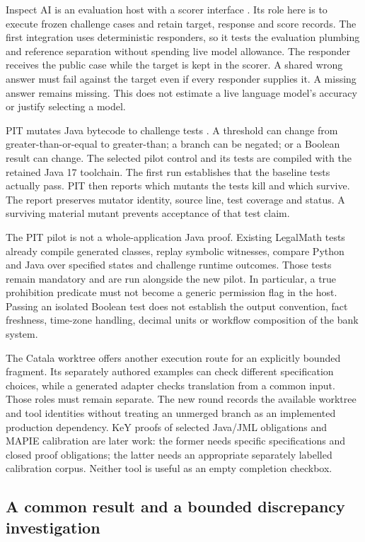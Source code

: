Inspect AI is an evaluation host with a scorer interface
\citep{inspectsoftware}. Its role here is to execute frozen challenge cases and
retain target, response and score records. The first integration uses deterministic
responders, so it tests the evaluation plumbing and reference separation without
spending live model allowance. The responder receives the public case while the
target is kept in the scorer. A shared wrong answer must fail against the target
even if every responder supplies it. A missing answer remains missing. This
does not estimate a live language model's accuracy or justify selecting a model.

PIT mutates Java bytecode to challenge tests \citep{pitsoftware}. A threshold can
change from greater-than-or-equal to greater-than; a branch can be negated; or a
Boolean result can change. The selected pilot control and its tests are compiled
with the retained Java 17 toolchain. The first run establishes that the baseline
tests actually pass. PIT then reports which mutants the tests kill and which
survive. The report preserves mutator identity, source line, test coverage and
status. A surviving material mutant prevents acceptance of that test claim.

The PIT pilot is not a whole-application Java proof. Existing LegalMath tests
already compile generated classes, replay symbolic witnesses, compare Python
and Java over specified states and challenge runtime outcomes. Those tests remain
mandatory and are run alongside the new pilot. In particular, a true prohibition
predicate must not become a generic permission flag in the host. Passing an
isolated Boolean test does not establish the output convention, fact freshness,
time-zone handling, decimal units or workflow composition of the bank system.

The Catala worktree offers another execution route for an explicitly bounded
fragment. Its separately authored examples can check different specification
choices, while a generated adapter checks translation from a common input. Those
roles must remain separate. The new round records the available worktree and
tool identities without treating an unmerged branch as an implemented production
dependency. KeY proofs of selected Java/JML obligations and MAPIE calibration
are later work: the former needs specific specifications and closed proof
obligations; the latter needs an appropriate separately labelled calibration
corpus. Neither tool is useful as an empty completion checkbox.

\subsection{A common result and a bounded discrepancy investigation}

